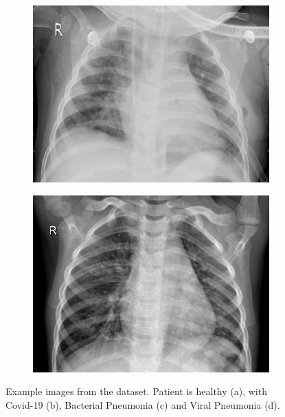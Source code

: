 \documentclass[conference]{IEEEtran}
\begin{document}
\begin{figure}[htp]
     \hfill
     \begin{subfigure}[b]{0.35\textwidth}
         \centering
         \includegraphics[width=\textwidth]{imgs/Pneumonia-Bacterial (1).jpg}
         \caption{}
         \label{fig:example_pneumonia_bact}
     \end{subfigure}
     \hfill
     \begin{subfigure}[b]{0.35\textwidth}
         \centering
         \includegraphics[width=\textwidth]{imgs/Pneumonia-Viral (1).jpg}
         \caption{}
         \label{fig:example_pneumonia_viral}
     \end{subfigure}
     \hfill
     \caption{Example images from the dataset. Patient is healthy (a), with Covid-19 (b), Bacterial Pneumonia (c) and Viral Pneumonia (d).}
     \label{fig:dataset_examples}
\end{figure}
\end{document}
